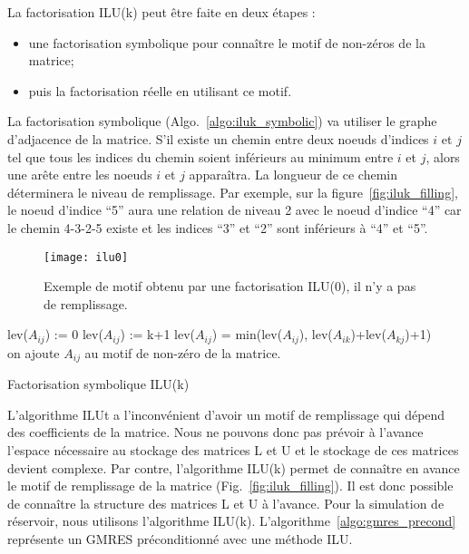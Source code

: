 La factorisation ILU(k) peut être faite en deux étapes :
\begin{itemize}
  \item une factorisation symbolique pour connaître le motif de non-zéros de la matrice;
  \item puis la factorisation réelle en utilisant ce motif.
\end{itemize}
%
La factorisation symbolique (Algo.~\ref{algo:iluk_symbolic}) va utiliser le graphe d'adjacence de la matrice.
%
S'il existe un chemin entre deux noeuds d'indices $i$ et $j$ tel que tous les indices du chemin soient inférieurs au minimum entre $i$ et $j$, alors une arête entre les noeuds $i$ et $j$ apparaîtra.
%
La longueur de ce chemin déterminera le niveau de remplissage.
%
Par exemple, sur la figure~\ref{fig:iluk_filling}, le noeud d'indice ``5'' aura une relation de niveau 2 avec le noeud d'indice ``4'' car le chemin 4-3-2-5 existe et les indices ``3'' et ``2'' sont inférieurs à ``4'' et ``5''.

\begin{figure}[!h]
  \centering
  \texttt{[image: ilu0]}
  \caption{Exemple de motif obtenu par une factorisation ILU(0), il n'y a pas de remplissage.}
  \label{fig:ilu0}
\end{figure}


\begin{algorithm}
  \label{algo:iluk_symbolic}
   {
     { lev($A_{ij}$) := 0 }
     { lev($A_{ij}$) := k+1 }
  }
   {
     {
       {
         {
          lev($A_{ij}$) = min(lev($A_{ij}$), lev($A_{ik}$)+lev($A_{kj}$)+1) \\
           {
            on ajoute $A_{ij}$ au motif de non-zéro de la matrice.\\
          }
        }
      }
    }
  }
  \caption{Factorisation symbolique ILU(k)}
\end{algorithm}


L'algorithme ILUt a l'inconvénient d'avoir un motif de remplissage qui dépend des coefficients de la matrice.
%
Nous ne pouvons donc pas prévoir à l'avance l'espace nécessaire au stockage des matrices L et U et le stockage de ces matrices devient complexe.
%
Par contre, l'algorithme ILU(k) permet de connaître en avance le motif de remplissage de la matrice (Fig.~\ref{fig:iluk_filling}).
%
Il est donc possible de connaître la structure des matrices L et U à l'avance.
%
Pour la simulation de réservoir, nous utilisons l'algorithme ILU(k).
%
L'algorithme~\ref{algo:gmres_precond} représente un GMRES préconditionné avec une méthode ILU.


